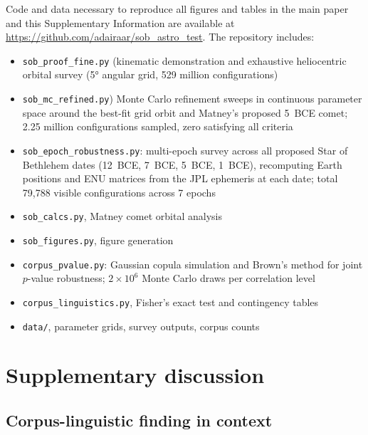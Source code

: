 \documentclass[11pt,a4paper]{article}
\begin{document}
Code and data necessary to reproduce all figures and tables in the main
paper and this Supplementary Information are available at \url{https://github.com/adairaar/sob_astro_test}.
The repository includes:
\begin{itemize}
  \item \texttt{sob\_proof\_fine.py} (kinematic demonstration and exhaustive heliocentric orbital survey (5° angular grid, 529 million configurations)
  \item \texttt{sob\_mc\_refined.py}) Monte Carlo refinement sweeps in continuous parameter space around the best-fit grid orbit and Matney's proposed 5~BCE comet; 2.25 million configurations sampled, zero satisfying all criteria
  \item \texttt{sob\_epoch\_robustness.py}: multi-epoch survey across all
    proposed Star of Bethlehem dates (12~BCE, 7~BCE, 5~BCE, 1~BCE), recomputing
    Earth positions and ENU matrices from the JPL ephemeris at each date;
    total 79,788 visible configurations across 7 epochs
  \item \texttt{sob\_calcs.py}, Matney comet orbital analysis
  \item \texttt{sob\_figures.py}, figure generation
  \item \texttt{corpus\_pvalue.py}: Gaussian copula simulation and Brown's
    method for joint $p$-value robustness; $2\times10^6$ Monte Carlo draws
    per correlation level
  \item \texttt{corpus\_linguistics.py}, Fisher's exact test and
    contingency tables
  \item \texttt{data/}, parameter grids, survey outputs, corpus counts
\end{itemize}

\section{Supplementary discussion}

\subsection{Corpus-linguistic finding in context}
\label{subsec:supp_ling_context}
\end{document}
